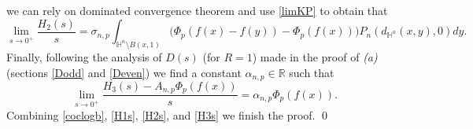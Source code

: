 \documentclass[a4paper,10pt, reqno]{amsart}
\theoremstyle{definition}
\theoremstyle{remark}
\numberwithin{equation}{section}
\begin{document}
{$$$$
we can rely on dominated convergence theorem and use \eqref{limKP} to obtain that
\begin{equation}\label{H2s}
\lim_{s\rightarrow 0^+}\frac{H_2(s)}{s}=\sigma_{n,p}\int_{\mathbb H^n\setminus B(x,1)}\big(\Phi_p(f(x)-f(y))-\Phi _p(f(x))\big)P_n(d_{\mathbb H^n}(x,y),0)dy.
\end{equation}
Finally, following the analysis of $D(s)$ (for $R=1$) made in the proof of {\it (a)} (sections \ref{Dodd} and \ref{Deven}) we find a constant $\alpha _{n,p}\in \mathbb R$ such that
\begin{equation}\label{H3s}
\lim_{s\rightarrow 0^+}\frac{H_3(s)-A_{n,p}\Phi_p(f(x))}{s}=\alpha_{n,p}\Phi _p(f(x)).
\end{equation}
Combining \eqref{coclogb}, \eqref{H1s}, \eqref{H2s}, and \eqref{H3s} we finish the proof.
\qed

}
\end{document}
